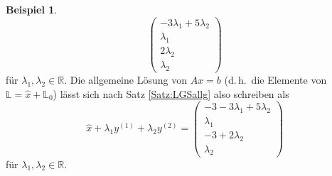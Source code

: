 \documentclass[a4paper,11pt,oneside]{article}
\theoremstyle{definition}
\newtheorem{example}{Beispiel}
\begin{document}
\begin{example}
\[\begin{pmatrix}-3\lambda_1+5\lambda_2\\\lambda_1\\2\lambda_2\\\lambda_2\end{pmatrix}
\]
für $\lambda_1,\lambda_2\in\mathbb R$. Die allgemeine Lösung von $Ax=b$ (d.\,h.\ die Elemente von ${\mathbb L}={\hat x}+{\mathbb L}_0$) lässt sich nach Satz \ref{Satz:LGSallg}  also schreiben als
$$
{\hat x}+\lambda_1 y^{(1)}+\lambda_2 y^{(2)}=
\begin{pmatrix}
-3-3\lambda_1+5\lambda_2\\
\lambda_1\\
-3+2\lambda_2\\
\lambda_2
\end{pmatrix}
$$
für $\lambda_1,\lambda_2\in\mathbb R$.
\end{example}
\end{document}
